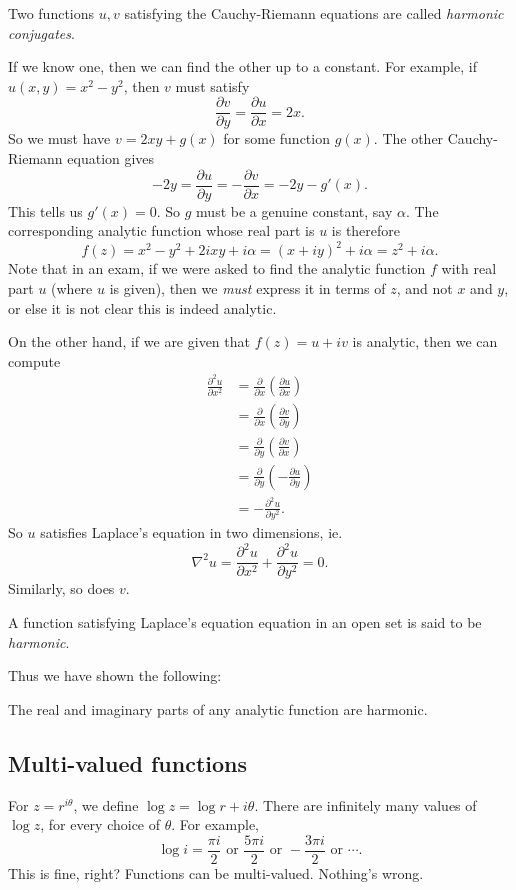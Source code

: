 \documentclass[a4paper]{article}
\begin{document}
\begin{defi}
  Two functions $u, v$ satisfying the Cauchy-Riemann equations are called \emph{harmonic conjugates}.
\end{defi}

If we know one, then we can find the other up to a constant. For example, if $u(x, y) = x^2 - y^2$, then $v$ must satisfy
\[
  \frac{\partial v}{\partial y} = \frac{\partial u}{\partial x} = 2x.
\]
So we must have $v = 2xy + g(x)$ for some function $g(x)$. The other Cauchy-Riemann equation gives
\[
  -2y = \frac{\partial u}{\partial y} = -\frac{\partial v}{\partial x} = -2y - g'(x).
\]
This tells us $g'(x) = 0$. So $g$ must be a genuine constant, say $\alpha$. The corresponding analytic function whose real part is $u$ is therefore
\[
  f(z) = x^2 - y^2 + 2ixy + i\alpha = (x + iy)^2 + i \alpha = z^2 + i\alpha.
\]
Note that in an exam, if we were asked to find the analytic function $f$ with real part $u$ (where $u$ is given), then we \emph{must} express it in terms of $z$, and not $x$ and $y$, or else it is not clear this is indeed analytic.

On the other hand, if we are given that $f(z) = u + iv$ is analytic, then we can compute
\begin{align*}
  \frac{\partial^2 u}{\partial x^2} &= \frac{\partial }{\partial x}\left(\frac{\partial u}{\partial x}\right)\\
  &= \frac{\partial }{\partial x} \left(\frac{\partial v}{\partial y}\right)\\
  &= \frac{\partial }{\partial y}\left(\frac{\partial v}{\partial x}\right)\\
  &= \frac{\partial }{\partial y}\left(- \frac{\partial u}{\partial y}\right)\\
  &= -\frac{\partial^2 u}{\partial y^2}.
\end{align*}
So $u$ satisfies Laplace's equation in two dimensions, ie.
\[
  \nabla^2 u = \frac{\partial^2 u}{\partial x^2} + \frac{\partial^2 u}{\partial y^2} = 0.
\]
Similarly, so does $v$.
\begin{defi}
  A function satisfying Laplace's equation equation in an open set is said to be \emph{harmonic}.
\end{defi}

Thus we have shown the following:
\begin{prop}
  The real and imaginary parts of any analytic function are harmonic.
\end{prop}

\subsection{Multi-valued functions}
For $z = r^{i\theta}$, we define $\log z = \log r + i \theta$. There are infinitely many values of $\log z$, for every choice of $\theta$. For example,
\[
  \log i = \frac{\pi i}{2} \text{ or }\frac{5\pi i}{2}\text{ or } -\frac{3\pi i}{2}\text{ or }\cdots.
\]
This is fine, right? Functions can be multi-valued. Nothing's wrong.
\end{document}
